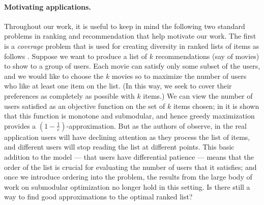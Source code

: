 \paragraph{\bf Motivating applications.} 
Throughout our work, it is useful to keep in mind the following two
standard problems in ranking and recommendation that help motivate our work.
The first is a {\em coverage} problem that is used for creating diversity
in ranked lists of items as follows 
\cite{agrawal2009, ashkan2015}.
Suppose we want to produce a list of $k$ recommendations (say of movies)
to show to a group of users.
Each movie can satisfy only some subset of the users, and we would like
to choose the $k$ movies so to maximize the number of users 
who like at least one item on the list.
(In this way, we seek to cover their preferences as completely as
possible with $k$ items.)
We can view the number of users satisfied 
as an objective function on the set of
$k$ items chosen; in \cite{agrawal2009} it is shown that this function
is monotone and submodular, and hence greedy maximization provides a
$(1-\frac{1}{e})$-approximation.
But as the authors of \cite{agrawal2009} observe, in the real application
users will have declining attention as they process the list of items,
and different users will stop reading the list at different points.
This basic addition to the model --- that users have
differential patience --- 
means that the order of the list is crucial for evaluating
the number of users that it satisfies; and once we introduce
ordering into the problem, the results from the large body of work on
submodular optimization no longer hold in this setting.
Is there still a way to find good approximations to the optimal 
ranked list?

